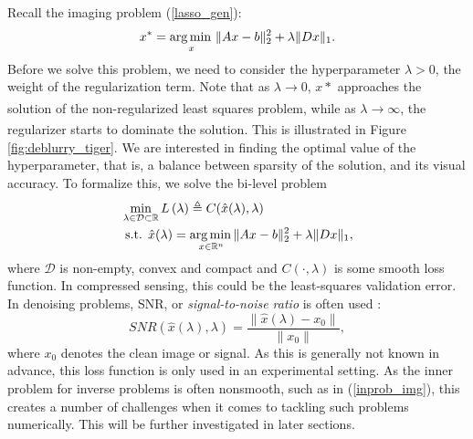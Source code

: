 \documentclass[11pt, twoside]{report}
\begin{document}
Recall the imaging problem (\ref{lasso_gen}):
\begin{equation*}
    x^* = \operatorname*{arg\, min \,}_x  \|Ax-b\|_2^2 + \lambda\|Dx\|_1.
\end{equation*}
Before we solve this problem, we need to consider the hyperparameter $\lambda > 0$, the weight of the regularization term. Note that as $\lambda \xrightarrow[]{} 0$, $x*$ approaches the solution of the non-regularized least squares problem, while as $\lambda \xrightarrow[]{} \infty$, the regularizer starts to dominate the solution. This is illustrated in Figure \ref{fig:deblurry_tiger}. We are interested in finding the optimal value of the hyperparameter, that is, a balance between sparsity of the solution, and its visual accuracy. To formalize this, we solve the bi-level problem
\begin{align} 
&\min _{\lambda \in \mathcal{D} \subset \mathbb{R}} L\left(\lambda \right) \triangleq C(\hat{x}(\lambda), \lambda) \label{bilev1_img}\\
&\text { s.t. } \hat{x}(\lambda) =\underset{x \in \mathbb{R}^{n}} {\operatorname*{arg\, min \,}} \|Ax-b\|_2^2 + \lambda\|Dx\|_1 \label{inprob_img},
\end{align}
where $\mathcal{D}$ is non-empty, convex and compact and $C(\cdot,\lambda)$ is some smooth loss function. In compressed sensing, this could be the least-squares validation error. In denoising problems, SNR, or {\em signal-to-noise ratio} is often used \cite{gonzalez2008digital}:
\begin{equation}
    SNR(\hat{x}(\lambda), \lambda) = \frac{\|\hat{x}(\lambda) - x_0\|}{\|x_0\|},
\end{equation}
where $x_0$ denotes the clean image or signal. As this is generally not known in advance, this loss function is only used in an experimental setting. As the inner problem for inverse problems is often nonsmooth, such as in (\ref{inprob_img}), this creates a number of challenges when it comes to tackling such problems numerically. This will be further investigated in later sections.
\end{document}
